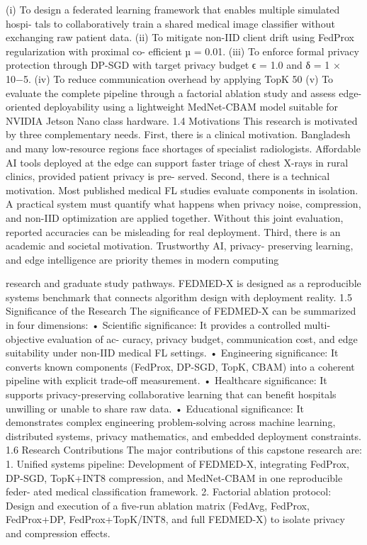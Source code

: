 (i) To design a federated learning framework that enables multiple simulated hospi- tals to collaboratively train a shared medical image classifier without exchanging raw patient data.
(ii) To mitigate non-IID client drift using FedProx regularization with proximal co- efficient µ = 0.01.
(iii) To enforce formal privacy protection through DP-SGD with target privacy budget ϵ = 1.0 and δ = 1 × 10−5.
(iv) To reduce communication overhead by applying TopK 50%
(v) To evaluate the complete pipeline through a factorial ablation study and assess edge-oriented deployability using a lightweight MedNet-CBAM model suitable for
NVIDIA Jetson Nano class hardware.
1.4
Motivations
This research is motivated by three complementary needs.
First, there is a clinical motivation. Bangladesh and many low-resource regions face shortages of specialist radiologists. Affordable AI tools deployed at the edge can support faster triage of chest X-rays in rural clinics, provided patient privacy is pre- served.
Second, there is a technical motivation.
Most published medical FL studies evaluate components in isolation. A practical system must quantify what happens when privacy noise, compression, and non-IID optimization are applied together. Without this joint evaluation, reported accuracies can be misleading for real deployment.
Third, there is an academic and societal motivation. Trustworthy AI, privacy- preserving learning, and edge intelligence are priority themes in modern computing

research and graduate study pathways.
FEDMED-X is designed as a reproducible systems benchmark that connects algorithm design with deployment reality.
1.5
Significance of the Research
The significance of FEDMED-X can be summarized in four dimensions:
• Scientific significance: It provides a controlled multi-objective evaluation of ac- curacy, privacy budget, communication cost, and edge suitability under non-IID medical FL settings.
• Engineering significance: It converts known components (FedProx, DP-SGD,
TopK, CBAM) into a coherent pipeline with explicit trade-off measurement.
• Healthcare significance: It supports privacy-preserving collaborative learning that can benefit hospitals unwilling or unable to share raw data.
• Educational significance: It demonstrates complex engineering problem-solving across machine learning, distributed systems, privacy mathematics, and embedded deployment constraints.
1.6
Research Contributions
The major contributions of this capstone research are:
1. Unified systems pipeline: Development of FEDMED-X, integrating FedProx,
DP-SGD, TopK+INT8 compression, and MedNet-CBAM in one reproducible feder- ated medical classification framework.
2. Factorial ablation protocol: Design and execution of a five-run ablation matrix (FedAvg, FedProx, FedProx+DP, FedProx+TopK/INT8, and full FEDMED-X) to isolate privacy and compression effects.

